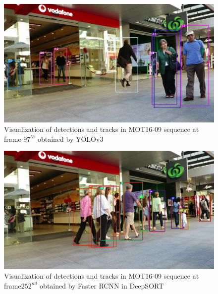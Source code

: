 \begin{figure}[h!]
    \centering
    \includegraphics[width=\textwidth]{Chapters/Fig/mot09_yolo_1.jpg}
    \caption{Visualization of detections and tracks in MOT16-09 sequence at frame $\text{97}^{th}$ obtained by YOLOv3}
    \label{fig:mot09_yolo_1}
\end{figure}
\pagebreak
\begin{figure}[h!]
    \centering
    \includegraphics[width=\textwidth]{Chapters/Fig/mot09_org_2.jpg}
    \caption{Visualization of detections and tracks in MOT16-09 sequence at frame$\text{252}^{nd}$ obtained by Faster \acrshort{RCNN} in DeepSORT\cite{Wojke2017simple}}
    \label{fig:mot09_org_2}
\end{figure}

